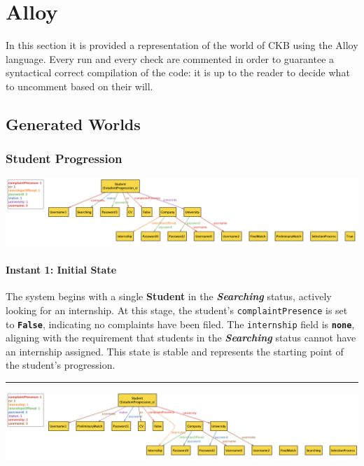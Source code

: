 \chapter{Alloy}

In this section it is provided a representation of the world of CKB using the Alloy language. Every
run and every check are commented in order to guarantee a syntactical correct compilation of the
code: it is up to the reader to decide what to uncomment based on their will.



\newpage
\section{Generated Worlds}

\graphicspath{ {./images/alloy/} }

\subsection{Student Progression}

\vspace{5mm}
\includegraphics[width=\textwidth]{a1.png}

\subsubsection*{Instant 1: Initial State}
The system begins with a single \textbf{Student} in the \textbf{\textit{Searching}} status, actively looking for an internship. At this stage, the student's \texttt{complaintPresence} is set to \textbf{\texttt{False}}, indicating no complaints have been filed. The \texttt{internship} field is \textbf{\texttt{none}}, aligning with the requirement that students in the \textbf{\textit{Searching}} status cannot have an internship assigned. This state is stable and represents the starting point of the student's progression.
\\
\hrule
\vspace{5mm}
\includegraphics[width=\textwidth]{a2.png}

